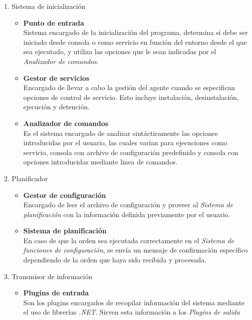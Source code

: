             \begin{enumerate}
                \item Sistema de inicialización
                    \begin{itemize}
                        \item \textbf{Punto de entrada} \\
                        Sistema encargado de la inicialización del programa, determina si debe ser iniciado desde consola o como servicio en función del entorno desde el que sea ejecutado, y utiliza las opciones que le sean indicadas por el \textit{Analizador de comandos}.
                            
                        \item \textbf{Gestor de servicios} \\ 
                        Encargado de llevar a cabo la gestión del agente cuando se especifican opciones de control de servicio. Esto incluye instalación, desinstalación, ejecución y detención.
                            
                        \item \textbf{Analizador de comandos} \\ 
                        Es el sistema encargado de analizar sintácticamente las opciones introducidas por el usuario, las cuales varían para ejecuciones como servicio, consola con archivo de configuración predefinido y consola con opciones introducidas mediante linea de comandos.
                    \end{itemize}
                \item Planificador
                    \begin{itemize}
                        \item \textbf{Gestor de configuración} \\ 
                        Encargado de leer el archivo de configuración y proveer al \textit{Sistema de planificación} con la información definida previamente por el usuario.
                        
                        \item \textbf{Sistema de planificación} \\
                        En caso de que la orden sea ejecutada correctamente en el \textit{Sistema de funciones de configuración}, se envía un mensaje de confirmación específico dependiendo de la orden que haya sido recibida y procesada.
                    \end{itemize}
                \item Transmisor de información
                    \begin{itemize}
                        \item \textbf{Plugins de entrada} \\ 
                        Son los plugins encargados de recopilar información del sistema mediante el uso de librerías \textit{.NET}. Sirven esta información a los \textit{Plugins de salida}
                            

\end{itemize}
\end{enumerate}
